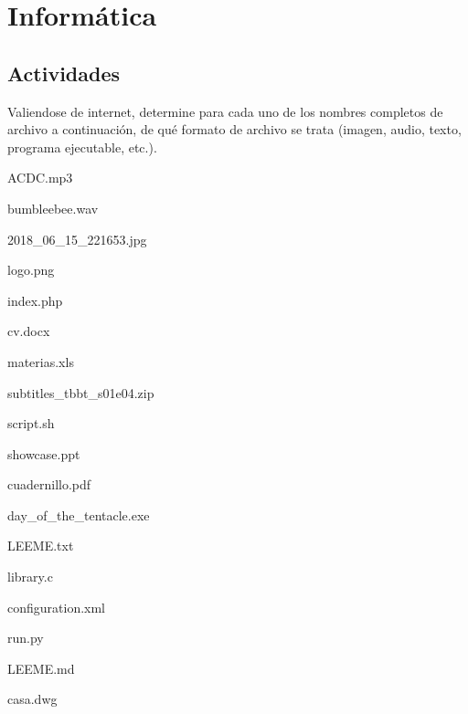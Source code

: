 
\chapter{Informática}

\setcounter{section}{4}
\section{Actividades}

\begin{exercise}
Valiendose de internet, determine para cada uno de los nombres completos de
archivo a continuación, de qué formato de archivo se trata (imagen, audio, texto,
programa ejecutable, etc.).

\begin{enumerate}[a)]
    \begin{minipage}{0.45\textwidth}
        \item ACDC.mp3
        \item bumbleebee.wav
        \item 2018\_06\_15\_221653.jpg
        \item logo.png
        \item index.php
        \item cv.docx
        \item materias.xls
        \item subtitles\_tbbt\_s01e04.zip
        \item script.sh
    \end{minipage}
    \begin{minipage}{0.45\textwidth}
        \item showcase.ppt
        \item cuadernillo.pdf
        \item day\_of\_the\_tentacle.exe
        \item LEEME.txt
        \item library.c
        \item configuration.xml
        \item run.py
        \item LEEME.md
        \item casa.dwg
    \end{minipage}
\end{enumerate}
\end{exercise}

